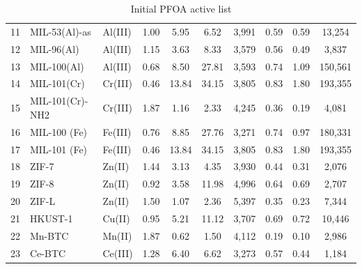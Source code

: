 \documentclass[twoside,twocolumn,9pt]{article}
\begin{document}
\begin{table}[h]
\begin{tabular}{lllccccccc}
		11 & MIL-53(Al)-as   & Al(III) & 1.00 & 5.95  & 6.52  & 3,991 & 0.59 & 0.59 & 13,254  \\
		12 & MIL-96(Al)      & Al(III) & 1.15 & 3.63  & 8.33  & 3,579 & 0.56 & 0.49 & 3,837   \\
		13 & MIL-100(Al)     & Al(III) & 0.68 & 8.50  & 27.81 & 3,593 & 0.74 & 1.09 & 150,561 \\
		14 & MIL-101(Cr)     & Cr(III) & 0.46 & 13.84 & 34.15 & 3,805 & 0.83 & 1.80 & 193,355 \\
		15 & MIL-101(Cr)-NH2 & Cr(III) & 1.87 & 1.16  & 2.33  & 4,245 & 0.36 & 0.19 & 4,081   \\
		16 & MIL-100 (Fe)    & Fe(III) & 0.76 & 8.85  & 27.76 & 3,271 & 0.74 & 0.97 & 180,331 \\
		17 & MIL-101 (Fe)    & Fe(III) & 0.46 & 13.84 & 34.15 & 3,805 & 0.83 & 1.80 & 193,355 \\
		18 & ZIF-7           & Zn(II)  & 1.44 & 3.13  & 4.35  & 3,930 & 0.44 & 0.31 & 2,076   \\
		19 & ZIF-8           & Zn(II)  & 0.92 & 3.58  & 11.98 & 4,996 & 0.64 & 0.69 & 2,707   \\
		20 & ZIF-L           & Zn(II)  & 1.50 & 1.07  & 2.36  & 5,397 & 0.35 & 0.23 & 7,344   \\
		21 & HKUST-1         & Cu(II)  & 0.95 & 5.21  & 11.12 & 3,707 & 0.69 & 0.72 & 10,446  \\
		22 & Mn-BTC          & Mn(II)  & 1.87 & 0.62  & 1.50  & 4,112 & 0.19 & 0.10 & 2,986   \\
		23 & Ce-BTC          & Ce(III) & 1.28 & 6.40  & 6.62  & 3,273 & 0.57 & 0.44 & 1,184  
	\end{tabular}
	\caption{Initial PFOA active list}
	\label{tab:Init-PFOA-active}
\end{table}
\end{document}
